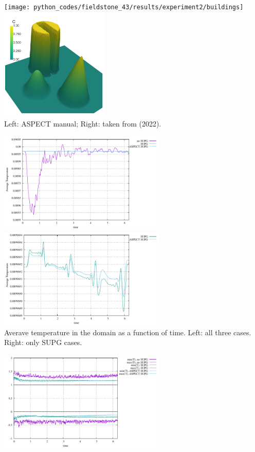 \begin{center}
\texttt{[image: python\_codes/fieldstone\_43/results/experiment2/buildings]}
\includegraphics[width=5.2cm]{python_codes/fieldstone_43/results/experiment2/kome22}\\
{\captionfont Left: ASPECT manual; Right: taken from \textcite{kome22} (2022).}
\end{center}


\begin{center}
\includegraphics[width=8cm]{python_codes/fieldstone_43/results/experiment2/avrg_T}
\includegraphics[width=8cm]{python_codes/fieldstone_43/results/experiment2/avrg_T2}\\
{\captionfont Averave temperature in the domain as a function of time. 
Left: all three cases. Right: only SUPG cases.}
\end{center}

\begin{center}
\includegraphics[width=8cm]{python_codes/fieldstone_43/results/experiment2/stats_T}
\end{center}

